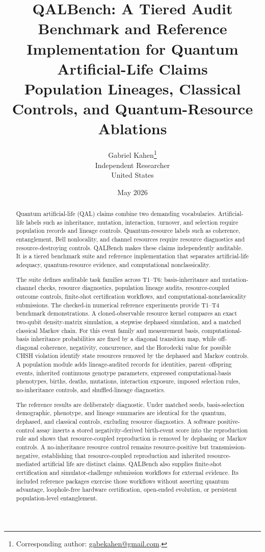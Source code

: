 \documentclass[11pt]{article}
\title{\textbf{QALBench: A Tiered Audit Benchmark and Reference Implementation for Quantum Artificial-Life Claims}\\
\large Population Lineages, Classical Controls, and Quantum-Resource Ablations}
\author{Gabriel Kahen\thanks{Corresponding author: \href{mailto:gabekahen@gmail.com}{gabekahen@gmail.com}.}\\Independent Researcher\\United States}
\date{May 2026}
\begin{document}
\maketitle

\begin{abstract}
Quantum artificial-life (QAL) claims combine two demanding vocabularies. Artificial-life labels such as inheritance, mutation, interaction, turnover, and selection require population records and lineage controls. Quantum-resource labels such as coherence, entanglement, Bell nonlocality, and channel resources require resource diagnostics and resource-destroying controls. QALBench makes these claims independently auditable. It is a tiered benchmark suite and reference implementation that separates artificial-life adequacy, quantum-resource evidence, and computational nonclassicality.

The suite defines auditable task families across T1--T6: basis-inheritance and mutation-channel checks, resource diagnostics, population lineage audits, resource-coupled outcome controls, finite-shot certification workflows, and computational-nonclassicality submissions. The checked-in numerical reference experiments provide T1--T4 benchmark demonstrations. A cloned-observable resource kernel compares an exact two-qubit density-matrix simulation, a stepwise dephased simulation, and a matched classical Markov chain. For this event family and measurement basis, computational-basis inheritance probabilities are fixed by a diagonal transition map, while off-diagonal coherence, negativity, concurrence, and the Horodecki value for possible CHSH violation identify state resources removed by the dephased and Markov controls. A population module adds lineage-audited records for identities, parent--offspring events, inherited continuous genotype parameters, expressed computational-basis phenotypes, births, deaths, mutations, interaction exposure, imposed selection rules, no-inheritance controls, and shuffled-lineage diagnostics.

The reference results are deliberately diagnostic. Under matched seeds, basis-selection demographic, phenotype, and lineage summaries are identical for the quantum, dephased, and classical controls, excluding resource diagnostics. A software positive-control assay inserts a stored negativity-derived birth-event score into the reproduction rule and shows that resource-coupled reproduction is removed by dephasing or Markov controls. A no-inheritance resource control remains resource-positive but transmission-negative, establishing that resource-coupled reproduction and inherited resource-mediated artificial life are distinct claims. QALBench also supplies finite-shot certification and simulator-challenge submission workflows for external evidence. Its included reference packages exercise those workflows without asserting quantum advantage, loophole-free hardware certification, open-ended evolution, or persistent population-level entanglement.
\end{abstract}
\end{document}
